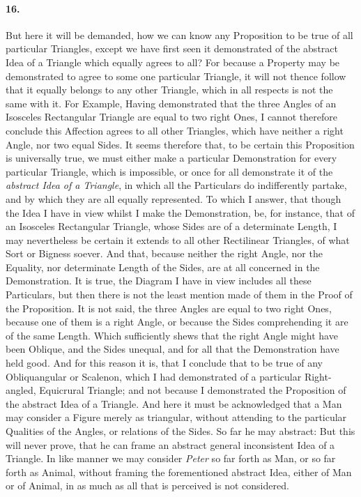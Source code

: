 \documentclass[]{article}
\newenvironment{sectionbody}{}{}
\begin{document}
\begin{sectionbody}
\paragraph{16.} But here it will be demanded, how we can know any Proposition to
be true of all particular Triangles, except we have first seen it
demonstrated of the abstract Idea of a Triangle which equally
agrees to all? For because a Property may be demonstrated to
agree to some one particular Triangle, it will not thence follow
that it equally belongs to any other Triangle, which in all
respects is not the same with it.  For Example, Having
demonstrated that the three Angles of an Isosceles Rectangular
Triangle are equal to two right Ones, I cannot therefore conclude
this Affection agrees to all other Triangles, which have neither
a right Angle, nor two equal Sides.  It seems therefore that, to
be certain this Proposition is universally true, we must either
make a particular Demonstration for every particular Triangle,
which is impossible, or once for all demonstrate it of the
\emph{abstract Idea of a Triangle}, in which all the
Particulars do indifferently partake, and by which they are all
equally represented.  To which I answer, that though the Idea I
have in view whilst I make the Demonstration, be, for instance,
that of an Isosceles Rectangular Triangle, whose Sides are of a
determinate Length, I may nevertheless be certain it extends to
all other Rectilinear Triangles, of what Sort or Bigness soever.
And that, because neither the right Angle, nor the Equality, nor
determinate Length of the Sides, are at all concerned in the
Demonstration.  It is true, the Diagram I have in view includes
all these Particulars, but then there is not the least mention
made of them in the Proof of the Proposition.  It is not said,
the three Angles are equal to two right Ones, because one of them
is a right Angle, or because the Sides comprehending it are of
the same Length.  Which sufficiently shews that the right Angle
might have been Oblique, and the Sides unequal, and for all that
the Demonstration have held good.  And for this reason it is,
that I conclude that to be true of any Obliquangular or Scalenon,
which I had demonstrated of a particular Right-angled, Equicrural
Triangle; and not because I demonstrated the Proposition of the
abstract Idea of a Triangle.  And here it must be acknowledged
that a Man may consider a Figure merely as triangular, without
attending to the particular Qualities of the Angles, or relations
of the Sides.  So far he may abstract: But this will never prove,
that he can frame an abstract general inconsistent Idea of a
Triangle.  In like manner we may consider \emph{Peter} so far
forth as Man, or so far forth as Animal, without framing the
forementioned abstract Idea, either of Man or of Animal, in as
much as all that is perceived is not considered.




\end{sectionbody}
\end{document}
